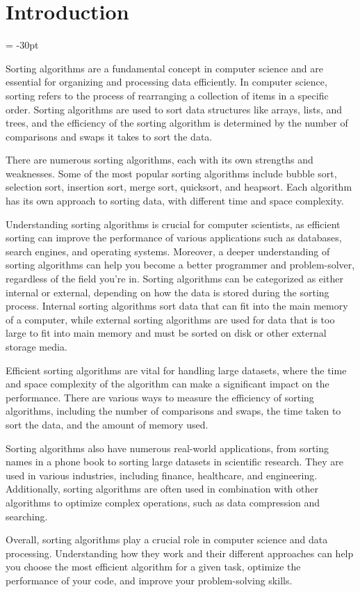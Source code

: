 

\chapter*{Introduction}
\oddsidemargin = -30pt







Sorting algorithms are a fundamental concept in computer science and are essential for organizing and processing data efficiently. In computer science, sorting refers to the process of rearranging a collection of items in a specific order. Sorting algorithms are used to sort data structures like arrays, lists, and trees, and the efficiency of the sorting algorithm is determined by the number of comparisons and swaps it takes to sort the data.

There are numerous sorting algorithms, each with its own strengths and weaknesses. Some of the most popular sorting algorithms include bubble sort, selection sort, insertion sort, merge sort, quicksort, and heapsort. Each algorithm has its own approach to sorting data, with different time and space complexity.

Understanding sorting algorithms is crucial for computer scientists, as efficient sorting can improve the performance of various applications such as databases, search engines, and operating systems. Moreover, a deeper understanding of sorting algorithms can help you become a better programmer and problem-solver, regardless of the field you're in.
Sorting algorithms can be categorized as either internal or external, depending on how the data is stored during the sorting process. Internal sorting algorithms sort data that can fit into the main memory of a computer, while external sorting algorithms are used for data that is too large to fit into main memory and must be sorted on disk or other external storage media.

Efficient sorting algorithms are vital for handling large datasets, where the time and space complexity of the algorithm can make a significant impact on the performance. There are various ways to measure the efficiency of sorting algorithms, including the number of comparisons and swaps, the time taken to sort the data, and the amount of memory used.

Sorting algorithms also have numerous real-world applications, from sorting names in a phone book to sorting large datasets in scientific research. They are used in various industries, including finance, healthcare, and engineering. Additionally, sorting algorithms are often used in combination with other algorithms to optimize complex operations, such as data compression and searching.

Overall, sorting algorithms play a crucial role in computer science and data processing. Understanding how they work and their different approaches can help you choose the most efficient algorithm for a given task, optimize the performance of your code, and improve your problem-solving skills.



